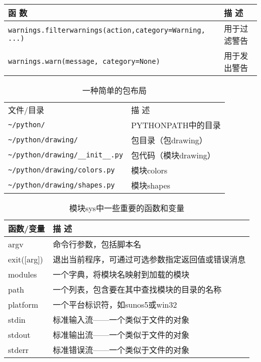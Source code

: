 \begin{table}
    \centering
    \begin{tabularx}{\textwidth}{lX}
        \hline
        函 数                                                          & 描 述    \\
        \hline
        \verb|warnings.filterwarnings(action,category=Warning, ...)| & 用于过滤警告 \\
        \verb|warnings.warn(message, category=None)|                 & 用于发出警告 \\
        \hline
    \end{tabularx}
\end{table}


\begin{table}
    \centering
    \caption{一种简单的包布局}
    \label{packageLayout}
    \begin{tabular}{ll}
        \hline
        \hline
        文件/目录                               & 描 述            \\
        \verb|~/python/|                    & PYTHONPATH中的目录 \\
        \verb|~/python/drawing/|            & 包目录（包drawing）  \\
        \verb|~/python/drawing/__init__.py| & 包代码（模块drawing） \\
        \verb|~/python/drawing/colors.py|   & 模块colors       \\
        \verb|~/python/drawing/shapes.py|   & 模块shapes       \\
        \hline
    \end{tabular}
\end{table}

\begin{table}
    \centering
    \caption{模块sys中一些重要的函数和变量}
    \label{sys}
    \begin{tabular}{ll}
        \hline
        函数/变量       & 描 述                      \\
        \hline
        argv        & 命令行参数，包括脚本名              \\
        exit([arg]) & 退出当前程序，可通过可选参数指定返回值或错误消息 \\
        modules     & 一个字典，将模块名映射到加载的模块        \\
        path        & 一个列表，包含要在其中查找模块的目录的名称    \\
        platform    & 一个平台标识符，如sunos5或win32    \\
        stdin       & 标准输入流——一个类似于文件的对象        \\
        stdout      & 标准输出流——一个类似于文件的对象        \\
        stderr      & 标准错误流——一个类似于文件的对象        \\
        \hline
    \end{tabular}
\end{table}

